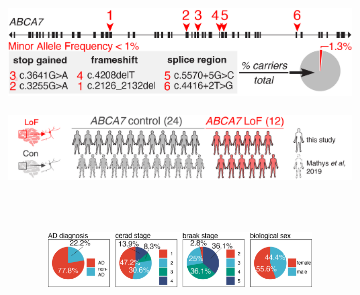\begin{figure}[ht]
    \begin{subfigure}[t]{.45\textwidth}
        \caption{}
        \includegraphics[width=\textwidth]{./main_plots/abca7_variants_cartoon.png}        
    \end{subfigure}
    \begin{subfigure}[t]{.55\textwidth}
        \caption{}
        \includegraphics[width=\textwidth]{./main_plots/cohort_cartoon.png}        
    \end{subfigure}
    \\[-1ex] 
    \begin{subfigure}[t]{.5\textwidth}
        \begin{subfigure}[t]{\textwidth}
            \caption{}
            \includegraphics[width=\textwidth]{./main_plots/pie_charts.png}        
        \end{subfigure}
        \begin{subfigure}[t]{.45\textwidth}
            \caption{}

\end{subfigure}
\end{subfigure}
\end{figure}
